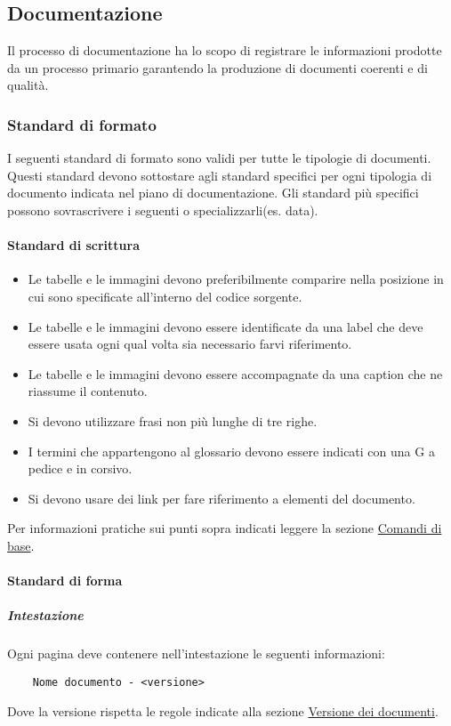 \subsection{Documentazione}
\label{subsec:documentazione}
Il processo di documentazione ha lo scopo di registrare le informazioni prodotte da un processo primario garantendo la produzione di documenti coerenti e di qualità.

\subsubsection{Standard di formato}
I seguenti standard di formato sono validi per tutte le tipologie di documenti.
Questi standard devono sottostare agli standard specifici per ogni tipologia di documento indicata nel piano di documentazione.
Gli standard più specifici possono sovrascrivere i seguenti o specializzarli(es. data).

\paragraph{Standard di scrittura}
\begin{itemize}
    \item Le tabelle e le immagini devono preferibilmente comparire nella posizione in cui sono specificate all'interno del codice sorgente.
    \item Le tabelle e le immagini devono essere identificate da una label che deve essere usata ogni qual volta sia necessario farvi riferimento.
    \item Le tabelle e le immagini devono essere accompagnate da una caption che ne riassume il contenuto.
    \item Si devono utilizzare frasi non più lunghe di tre righe.
    \item I termini che appartengono al glossario devono essere indicati con una G a pedice e in corsivo.
    \item Si devono usare dei link per fare riferimento a elementi del documento.
\end{itemize}
Per informazioni pratiche sui punti sopra indicati leggere la sezione \hyperref[par:comandi_di_base]{Comandi di base}.

\paragraph{Standard di forma}

\subparagraph{Intestazione}
Ogni pagina deve contenere nell'intestazione le seguenti informazioni:
\begin{lstlisting}
    Nome documento - <versione>
\end{lstlisting}
Dove la versione rispetta le regole indicate alla sezione \hyperref[par:versione_documenti]{Versione dei documenti}. 

